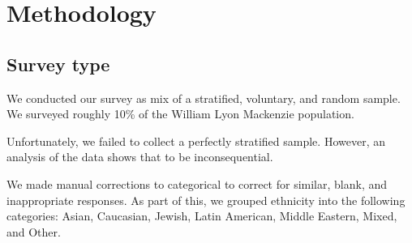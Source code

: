\chapter{Methodology}

\section{Survey type}
We conducted our survey as mix of a stratified, voluntary, and random sample.
We surveyed roughly 10\% of the William Lyon Mackenzie population.

Unfortunately, we failed to collect a perfectly stratified sample.
However, an analysis of the data shows that to be inconsequential.

We made manual corrections to categorical to correct for similar, blank, and inappropriate responses.
As part of this, we grouped ethnicity into the following categories: Asian, Caucasian, Jewish, Latin American, Middle Eastern, Mixed, and Other.
